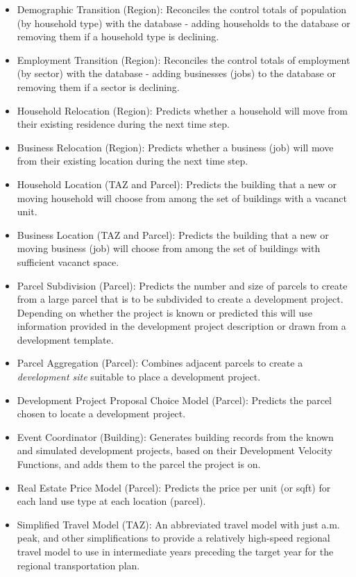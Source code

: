 \begin{itemize}
\begin{itemize}
\item Demographic Transition (Region): Reconciles the control totals
of population (by household type) with the database - adding households
to the database or removing them if a household type is declining.
\item Employment Transition (Region): Reconciles the control totals
of employment (by sector) with the database - adding businesses (jobs)
to the database or removing them if a sector is declining.
\item Household Relocation (Region): Predicts whether a household will
move from their existing residence during the next time step.
\item Business Relocation (Region): Predicts whether a business  (job)
will move from their existing location during the next time step.
\item Household Location (TAZ and Parcel): Predicts the building that
a new or moving household will choose from among the set of buildings
with a vacanct unit.
\item Business Location (TAZ and Parcel): Predicts the building that a
new or moving business (job) will choose from among the set of buildings
with sufficient vacanct space.
\item Parcel Subdivision (Parcel): Predicts the number and size of
parcels to create from a large parcel that is to be subdivided to create
a development project. Depending on whether the project is known or
predicted this will use information provided in the development project
description or drawn from a development template.
\item Parcel Aggregation (Parcel): Combines adjacent parcels to create
a \emph{development site} suitable to place a development project.
\item Development Project Proposal Choice Model (Parcel): Predicts the
parcel chosen to locate a development project.
\item Event Coordinator (Building): Generates building records from 
the known and simulated development projects, based on their Development
Velocity Functions, and adds them to the parcel the project is on.
\item Real Estate Price Model (Parcel): Predicts the price
per unit (or sqft) for each land use type at each location (parcel).
\item Simplified Travel Model (TAZ): An abbreviated travel model with
just a.m. peak, and other simplifications to provide a relatively
high-speed regional travel model to use in intermediate years preceding
the target year for the regional transportation plan.
\end{itemize}
\end{itemize}

